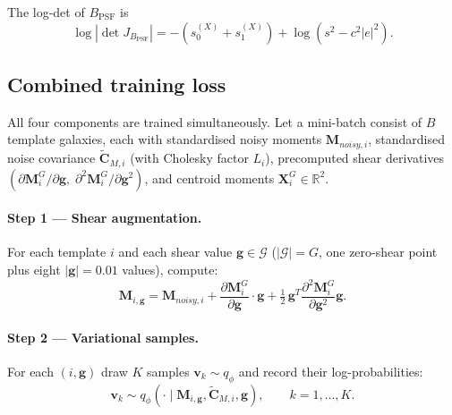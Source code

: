 The log-det of $B_{\mathrm{PSF}}$ is
\begin{equation}
  \log|\det J_{B_{\mathrm{PSF}}}|
  = -(s_0^{(X)}+s_1^{(X)}) + \log(s^2-c^2|e|^2).
\end{equation}

\subsection*{Combined training loss}

All four components are trained simultaneously.  Let a mini-batch consist
of $B$ template galaxies, each with standardised noisy moments
$\mathbf{M}_{noisy,i}$, standardised noise covariance $\tilde{\mathbf{C}}_{M,i}$
(with Cholesky factor $L_i$), precomputed shear derivatives
$(\partial\mathbf{M}_i^G/\partial\mathbf{g},\;\partial^2\mathbf{M}_i^G/\partial\mathbf{g}^2)$,
and centroid moments $\mathbf{X}_i^G\in\mathbb{R}^2$.

\paragraph{Step 1 — Shear augmentation.}
For each template $i$ and each shear value $\mathbf{g}\in\mathcal{G}$ ($|\mathcal{G}|=G$,
one zero-shear point plus eight $|\mathbf{g}|=0.01$ values), compute:
\begin{equation}
  \mathbf{M}_{i,\mathbf{g}} = \mathbf{M}_{noisy,i}
    + \frac{\partial\mathbf{M}_i^G}{\partial\mathbf{g}}\cdot\mathbf{g}
    + \tfrac{1}{2}\,\mathbf{g}^T\frac{\partial^2\mathbf{M}_i^G}{\partial\mathbf{g}^2}\mathbf{g}.
\end{equation}

\paragraph{Step 2 — Variational samples.}
For each $(i,\mathbf{g})$ draw $K$ samples $\mathbf{v}_k\sim q_\phi$ and
record their log-probabilities:
\begin{equation}
  \mathbf{v}_k\sim q_\phi(\cdot\mid\mathbf{M}_{i,\mathbf{g}},\tilde{\mathbf{C}}_{M,i},\mathbf{g}),
  \qquad k=1,\ldots,K.
\end{equation}

